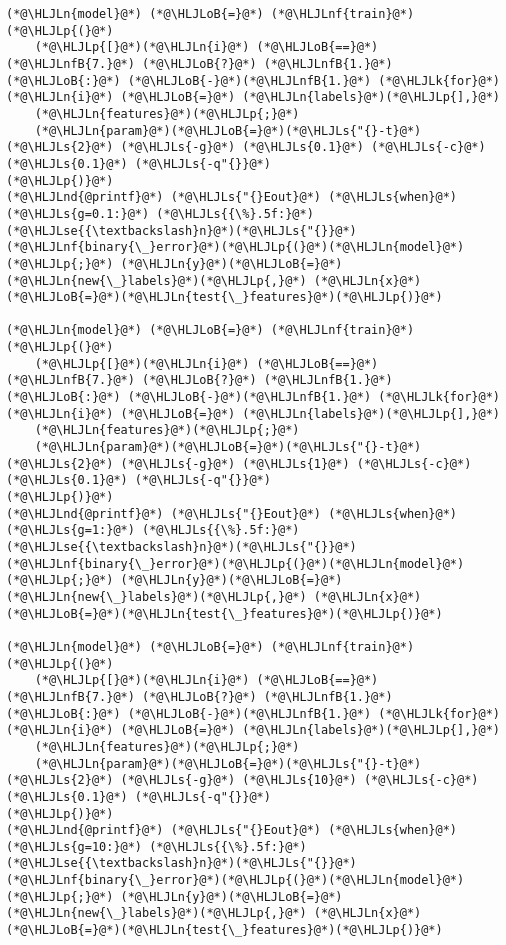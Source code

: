 \documentclass[12pt,a4paper]{article}
\newcommand{\HLJLk}[1]{\textcolor[RGB]{148,91,176}{\textbf{#1}}}
\newcommand{\HLJLn}[1]{#1}
\newcommand{\HLJLnd}[1]{\textcolor[RGB]{214,102,97}{#1}}
\newcommand{\HLJLnf}[1]{\textcolor[RGB]{66,102,213}{#1}}
\newcommand{\HLJLs}[1]{\textcolor[RGB]{201,61,57}{#1}}
\newcommand{\HLJLse}[1]{\textcolor[RGB]{59,151,46}{#1}}
\newcommand{\HLJLnfB}[1]{\textcolor[RGB]{59,151,46}{#1}}
\newcommand{\HLJLoB}[1]{\textcolor[RGB]{102,102,102}{\textbf{#1}}}
\newcommand{\HLJLp}[1]{#1}
\begin{document}
\begin{lstlisting}
(*@\HLJLn{model}@*) (*@\HLJLoB{=}@*) (*@\HLJLnf{train}@*)(*@\HLJLp{(}@*)
    (*@\HLJLp{[}@*)(*@\HLJLn{i}@*) (*@\HLJLoB{==}@*) (*@\HLJLnfB{7.}@*) (*@\HLJLoB{?}@*) (*@\HLJLnfB{1.}@*) (*@\HLJLoB{:}@*) (*@\HLJLoB{-}@*)(*@\HLJLnfB{1.}@*) (*@\HLJLk{for}@*) (*@\HLJLn{i}@*) (*@\HLJLoB{=}@*) (*@\HLJLn{labels}@*)(*@\HLJLp{],}@*) 
    (*@\HLJLn{features}@*)(*@\HLJLp{;}@*) 
    (*@\HLJLn{param}@*)(*@\HLJLoB{=}@*)(*@\HLJLs{"{}-t}@*) (*@\HLJLs{2}@*) (*@\HLJLs{-g}@*) (*@\HLJLs{0.1}@*) (*@\HLJLs{-c}@*) (*@\HLJLs{0.1}@*) (*@\HLJLs{-q"{}}@*)
(*@\HLJLp{)}@*)
(*@\HLJLnd{@printf}@*) (*@\HLJLs{"{}Eout}@*) (*@\HLJLs{when}@*) (*@\HLJLs{g=0.1:}@*) (*@\HLJLs{{\%}.5f:}@*)(*@\HLJLse{{\textbackslash}n}@*)(*@\HLJLs{"{}}@*) (*@\HLJLnf{binary{\_}error}@*)(*@\HLJLp{(}@*)(*@\HLJLn{model}@*)(*@\HLJLp{;}@*) (*@\HLJLn{y}@*)(*@\HLJLoB{=}@*)(*@\HLJLn{new{\_}labels}@*)(*@\HLJLp{,}@*) (*@\HLJLn{x}@*)(*@\HLJLoB{=}@*)(*@\HLJLn{test{\_}features}@*)(*@\HLJLp{)}@*)

(*@\HLJLn{model}@*) (*@\HLJLoB{=}@*) (*@\HLJLnf{train}@*)(*@\HLJLp{(}@*)
    (*@\HLJLp{[}@*)(*@\HLJLn{i}@*) (*@\HLJLoB{==}@*) (*@\HLJLnfB{7.}@*) (*@\HLJLoB{?}@*) (*@\HLJLnfB{1.}@*) (*@\HLJLoB{:}@*) (*@\HLJLoB{-}@*)(*@\HLJLnfB{1.}@*) (*@\HLJLk{for}@*) (*@\HLJLn{i}@*) (*@\HLJLoB{=}@*) (*@\HLJLn{labels}@*)(*@\HLJLp{],}@*) 
    (*@\HLJLn{features}@*)(*@\HLJLp{;}@*) 
    (*@\HLJLn{param}@*)(*@\HLJLoB{=}@*)(*@\HLJLs{"{}-t}@*) (*@\HLJLs{2}@*) (*@\HLJLs{-g}@*) (*@\HLJLs{1}@*) (*@\HLJLs{-c}@*) (*@\HLJLs{0.1}@*) (*@\HLJLs{-q"{}}@*)
(*@\HLJLp{)}@*)
(*@\HLJLnd{@printf}@*) (*@\HLJLs{"{}Eout}@*) (*@\HLJLs{when}@*) (*@\HLJLs{g=1:}@*) (*@\HLJLs{{\%}.5f:}@*)(*@\HLJLse{{\textbackslash}n}@*)(*@\HLJLs{"{}}@*) (*@\HLJLnf{binary{\_}error}@*)(*@\HLJLp{(}@*)(*@\HLJLn{model}@*)(*@\HLJLp{;}@*) (*@\HLJLn{y}@*)(*@\HLJLoB{=}@*)(*@\HLJLn{new{\_}labels}@*)(*@\HLJLp{,}@*) (*@\HLJLn{x}@*)(*@\HLJLoB{=}@*)(*@\HLJLn{test{\_}features}@*)(*@\HLJLp{)}@*)

(*@\HLJLn{model}@*) (*@\HLJLoB{=}@*) (*@\HLJLnf{train}@*)(*@\HLJLp{(}@*)
    (*@\HLJLp{[}@*)(*@\HLJLn{i}@*) (*@\HLJLoB{==}@*) (*@\HLJLnfB{7.}@*) (*@\HLJLoB{?}@*) (*@\HLJLnfB{1.}@*) (*@\HLJLoB{:}@*) (*@\HLJLoB{-}@*)(*@\HLJLnfB{1.}@*) (*@\HLJLk{for}@*) (*@\HLJLn{i}@*) (*@\HLJLoB{=}@*) (*@\HLJLn{labels}@*)(*@\HLJLp{],}@*) 
    (*@\HLJLn{features}@*)(*@\HLJLp{;}@*) 
    (*@\HLJLn{param}@*)(*@\HLJLoB{=}@*)(*@\HLJLs{"{}-t}@*) (*@\HLJLs{2}@*) (*@\HLJLs{-g}@*) (*@\HLJLs{10}@*) (*@\HLJLs{-c}@*) (*@\HLJLs{0.1}@*) (*@\HLJLs{-q"{}}@*)
(*@\HLJLp{)}@*)
(*@\HLJLnd{@printf}@*) (*@\HLJLs{"{}Eout}@*) (*@\HLJLs{when}@*) (*@\HLJLs{g=10:}@*) (*@\HLJLs{{\%}.5f:}@*)(*@\HLJLse{{\textbackslash}n}@*)(*@\HLJLs{"{}}@*) (*@\HLJLnf{binary{\_}error}@*)(*@\HLJLp{(}@*)(*@\HLJLn{model}@*)(*@\HLJLp{;}@*) (*@\HLJLn{y}@*)(*@\HLJLoB{=}@*)(*@\HLJLn{new{\_}labels}@*)(*@\HLJLp{,}@*) (*@\HLJLn{x}@*)(*@\HLJLoB{=}@*)(*@\HLJLn{test{\_}features}@*)(*@\HLJLp{)}@*)


\end{lstlisting}
\end{document}
